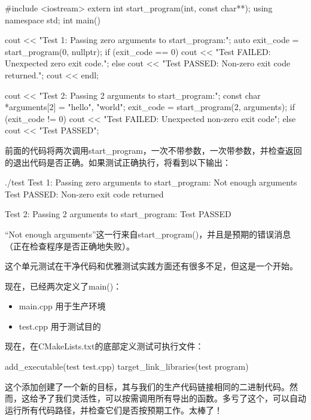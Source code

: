 
\begin{cpp}
#include <iostream>
extern int start_program(int, const char**);
using namespace std;
int main()
{
    cout << "Test 1: Passing zero arguments to start_program:\n";
    auto exit_code = start_program(0, nullptr);
    if (exit_code == 0)
        cout << "Test FAILED: Unexpected zero exit code.\n";
    else
        cout << "Test PASSED: Non-zero exit code returned.\n";
    cout << endl;

    cout << "Test 2: Passing 2 arguments to start_program:\n";
    const char *arguments[2] = {"hello", "world"};
    exit_code = start_program(2, arguments);
    if (exit_code != 0)
        cout << "Test FAILED: Unexpected non-zero exit code\n";
    else
        cout << "Test PASSED\n";
}
\end{cpp}

前面的代码将两次调用start\_program，一次不带参数，一次带参数，并检查返回的退出代码是否正确。如果测试正确执行，将看到以下输出：

\begin{shell}
./test
Test 1: Passing zero arguments to start_program:
Not enough arguments
Test PASSED: Non-zero exit code returned

Test 2: Passing 2 arguments to start_program:
Test PASSED
\end{shell}

“Not enough arguments”这一行来自start\_program()，并且是预期的错误消息（正在检查程序是否正确地失败）。

这个单元测试在干净代码和优雅测试实践方面还有很多不足，但这是一个开始。

现在，已经两次定义了main()：

\begin{itemize}
\item
main.cpp 用于生产环境

\item
test.cpp 用于测试目的
\end{itemize}

现在，在CMakeLists.txt的底部定义测试可执行文件：

\begin{cmake}
add_executable(test test.cpp)
target_link_libraries(test program)
\end{cmake}

这个添加创建了一个新的目标，其与我们的生产代码链接相同的二进制代码。然而，这给予了我们灵活性，可以按需调用所有导出的函数。多亏了这个，可以自动运行所有代码路径，并检查它们是否按预期工作。太棒了！
















